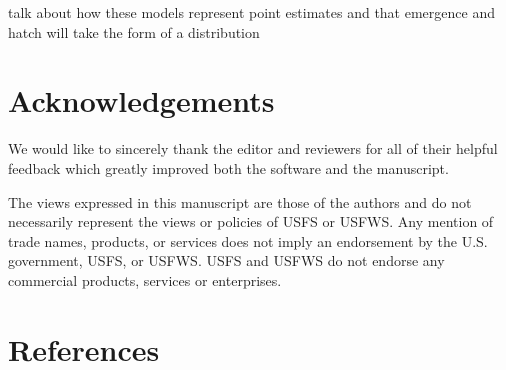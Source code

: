 \documentclass[12pt,halfline,a4paper,]{ouparticle}
\begin{document}
talk about how these models represent point estimates and that emergence
and hatch will take the form of a distribution

\section{Acknowledgements}\label{acknowledgements}

We would like to sincerely thank the editor and reviewers for all of
their helpful feedback which greatly improved both the software and the
manuscript.

The views expressed in this manuscript are those of the authors and do
not necessarily represent the views or policies of USFS or USFWS. Any
mention of trade names, products, or services does not imply an
endorsement by the U.S. government, USFS, or USFWS. USFS and USFWS do
not endorse any commercial products, services or enterprises.

\section*{References}\label{references}
\end{document}
